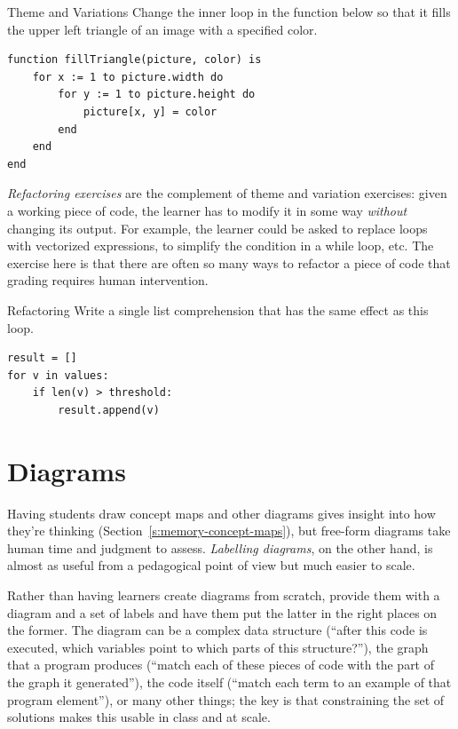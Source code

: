 \begin{aside}{Theme and Variations}
  Change the inner loop in the function below so that it fills the upper
  left triangle of an image with a specified color.

\begin{verbatim}
function fillTriangle(picture, color) is
    for x := 1 to picture.width do
        for y := 1 to picture.height do
            picture[x, y] = color
        end
    end
end
\end{verbatim}
\end{aside}

\emph{Refactoring exercises} are the complement of theme and variation
exercises: given a working piece of code, the learner has to modify it
in some way \emph{without} changing its output. For example, the learner
could be asked to replace loops with vectorized expressions, to simplify
the condition in a while loop, etc. The exercise here is that there are
often so many ways to refactor a piece of code that grading requires
human intervention.

\begin{aside}{Refactoring}
  Write a single list comprehension that has the same effect as this
  loop.

\begin{verbatim}
result = []
for v in values:
    if len(v) > threshold:
        result.append(v)
\end{verbatim}
\end{aside}

\section{Diagrams}\label{s:exercises-diagrams}

Having students draw concept maps and other diagrams gives insight into
how they're thinking (Section~\ref{s:memory-concept-maps}), but free-form
diagrams take human time and judgment to assess. \emph{Labelling diagrams},
on the other hand, is almost as useful from a pedagogical point of view
but much easier to scale.

Rather than having learners create diagrams from scratch, provide them
with a diagram and a set of labels and have them put the latter in the
right places on the former. The diagram can be a complex data structure
(``after this code is executed, which variables point to which parts of
this structure?''), the graph that a program produces (``match each of
these pieces of code with the part of the graph it generated''), the code
itself (``match each term to an example of that program element''), or
many other things; the key is that constraining the set of solutions
makes this usable in class and at scale.


